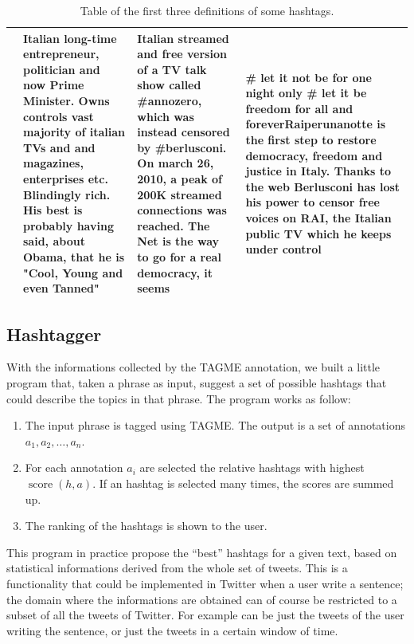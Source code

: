 \documentclass[a4paper,11pt,oneside]{article}
\DeclareMathOperator{\score}{score}
\begin{document}
\begin{table}[h]
\begin{tabular}{ | l | p{4cm} | p{4cm} | p{4cm} |}
\raisebox{-1mm}{raiperunanotte} & \small{Italian long-time entrepreneur, politician and now Prime Minister. Owns controls vast majority of italian TVs and and magazines, enterprises etc. Blindingly rich. His best is probably having said, about Obama, that he is "Cool, Young and even Tanned"} & \small{Italian streamed and free version of a TV talk show called \#annozero, which was instead censored by \#berlusconi. On march 26, 2010, a peak of 200K streamed connections was reached. The Net is the way to go for a real democracy, it seems} & \small{\# let it not be for one night only  \# let it be freedom for all and forever}\small{Raiperunanotte is the first step to restore democracy, freedom and justice in Italy. Thanks to the web Berlusconi has lost his power to censor free voices on RAI, the Italian public TV which he keeps under control}\\
 \hline
    \end{tabular}
    \caption{Table of the first three definitions of some hashtags.}
\end{table}


\subsection{Hashtagger}
\label{sec:tagger}
With the informations collected by the TAGME annotation, we built a little program that, taken a phrase as input, suggest a set of possible hashtags that could describe the topics in that phrase.
The program works as follow:
\begin{enumerate}
\item The input phrase is tagged using TAGME. The output is a set of annotations $a_1, a_2,\ldots, a_n$.
\item For each annotation $a_i$ are selected the relative hashtags with highest $\score(h,a)$. If an hashtag is selected many times, the scores are summed up.
\item The ranking of the hashtags is shown to the user.
\end{enumerate}

This program in practice propose the ``best'' hashtags for a given text, based on statistical informations derived from the whole set of tweets. This is a functionality that could be implemented in Twitter when a user write a sentence; the domain where the informations are obtained can of course be restricted to a subset of all the tweets of Twitter. For example  can be just the tweets of the user writing the sentence, or just the tweets in a certain window of time.  
\end{document}
